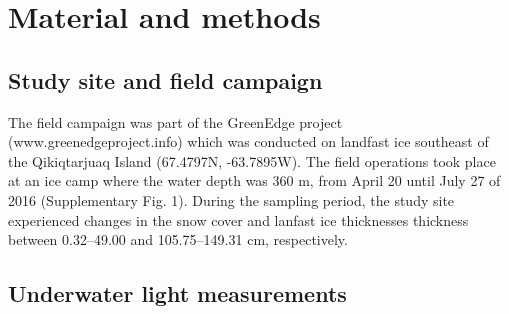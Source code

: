 \section{Material and methods}

\subsection{Study site and field campaign}

The field campaign was part of the GreenEdge project (www.greenedgeproject.info)  which was conducted on landfast ice southeast of the Qikiqtarjuaq Island (67.4797N, -63.7895W). The field operations took place at an ice camp where the water depth was 360 m, from April 20 until July 27 of 2016 (Supplementary Fig. 1). During the sampling period, the study site experienced changes in the snow cover and lanfast ice thicknesses thickness between 0.32--49.00 and 105.75--149.31 cm, respectively.

\subsection{Underwater light measurements}

